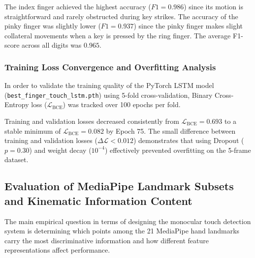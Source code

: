 The index finger achieved the highest accuracy ($F1 = 0.986$) since its motion is straightforward and rarely obstructed during key strikes. The accuracy of the pinky finger was slightly lower ($F1 = 0.937$) since the pinky finger makes slight collateral movements when a key is pressed by the ring finger. The average F1-score across all digits was $0.965$.

\subsubsection{Training Loss Convergence and Overfitting Analysis}
In order to validate the training quality of the PyTorch LSTM model (\texttt{best\allowbreak\_finger\allowbreak\_touch\allowbreak\_lstm.pth}) using 5-fold cross-validation, Binary Cross-Entropy loss ($\mathcal{L}_{\text{BCE}}$) was tracked over 100 epochs per fold.

Training and validation losses decreased consistently from $\mathcal{L}_{\text{BCE}} = 0.693$ to a stable minimum of $\mathcal{L}_{\text{BCE}} = 0.082$ by Epoch 75. The small difference between training and validation losses ($\Delta \mathcal{L} < 0.012$) demonstrates that using Dropout ($p = 0.30$) and weight decay ($10^{-4}$) effectively prevented overfitting on the 5-frame dataset.

\subsection{Evaluation of MediaPipe Landmark Subsets and Kinematic Information Content}
\label{subsec:test_landmark_ablation}
The main empirical question in terms of designing the monocular touch detection system is determining which points among the 21 MediaPipe hand landmarks carry the most discriminative information and how different feature representations affect performance.

